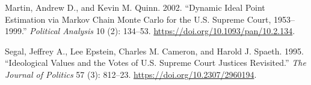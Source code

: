 \documentclass[
  11pt,
]{article}
\newlength{\cslhangindent}
\newenvironment{CSLReferences}[2] %
 {%
  \setlength{\parindent}{0pt}
  \ifodd #1 \everypar{\setlength{\hangindent}{\cslhangindent}}\ignorespaces\fi
  \ifnum #2 > 0
  \setlength{\parskip}{#2\baselineskip}
  \fi
 }%
 {}
\begin{document}
\begin{CSLReferences}{1}{0}
Martin, Andrew D., and Kevin M. Quinn. 2002. {``Dynamic {Ideal Point
Estimation} via {Markov Chain Monte Carlo} for the {U}.{S}. {Supreme
Court}, 1953--1999.''} \emph{Political Analysis} 10 (2): 134--53.
\url{https://doi.org/10.1093/pan/10.2.134}.

Segal, Jeffrey A., Lee Epstein, Charles M. Cameron, and Harold J.
Spaeth. 1995. {``Ideological {Values} and the {Votes} of {U}.{S}.
{Supreme Court Justices Revisited}.''} \emph{The Journal of Politics} 57
(3): 812--23. \url{https://doi.org/10.2307/2960194}.

\end{CSLReferences}
\end{document}
